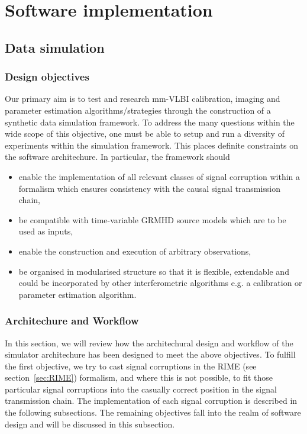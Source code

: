 \chapter{Software implementation}

\section{Data simulation}\label{sec:sim}
\subsection{Design objectives}
Our primary aim is to test and research mm-VLBI calibration, imaging and parameter estimation algorithms/strategies through the construction of a synthetic data simulation framework. To address the many questions within the wide scope of this objective, one must be able to setup and run a diversity of experiments within the simulation framework. This places definite constraints on the software architechure. In particular, the framework should 

\begin{itemize}
 \item enable the implementation of all relevant classes of signal corruption within a formalism which ensures consistency with the causal signal transmission chain,
 \item be compatible with time-variable GRMHD source models which are to be used as inputs,
 \item enable the construction and execution of arbitrary observations,
 
 \item be organised in modularised structure so that it is flexible, extendable and could be incorporated by other interferometric algorithms e.g. a calibration or parameter estimation algorithm.
\end{itemize}

\subsection{Architechure and Workflow}
In this section, we will review how the architechural design and workflow of the simulator architechure has been designed to meet the above objectives. To fulfill the first objective, we try to cast signal corruptions in the RIME (see section~\ref{sec:RIME}) formalism, and where this is not possible, to fit those particular signal corruptions into the casually correct position in the signal transmission chain. The implementation of each signal corruption is described in the following subsections. The remaining objectives fall into the realm of software design and will be discussed in this subsection.


